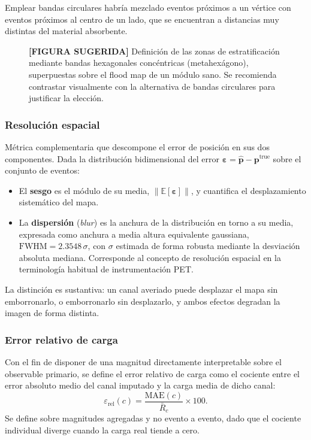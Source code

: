Emplear bandas circulares habría mezclado eventos próximos a un vértice con eventos próximos al
centro de un lado, que se encuentran a distancias muy distintas del material absorbente.

\begin{figure}[htbp]
\centering
\caption{\textbf{[FIGURA SUGERIDA]} Definición de las zonas de estratificación mediante bandas
hexagonales concéntricas (metahexágono), superpuestas sobre el flood map de un módulo sano. Se
recomienda contrastar visualmente con la alternativa de bandas circulares para justificar la
elección.}
\label{fig:metahexagono}
\end{figure}

\subsubsection{Resolución espacial}
\label{subsec:met-resolucion}

Métrica complementaria que descompone el error de posición en sus dos componentes. Dada la
distribución bidimensional del error $\boldsymbol{\varepsilon} = \hat{\mathbf{p}} - \mathbf{p}^{\text{true}}$
sobre el conjunto de eventos:
\begin{itemize}
    \item El \textbf{sesgo} es el módulo de su media, $\|\mathbb{E}[\boldsymbol{\varepsilon}]\|$, y
    cuantifica el desplazamiento sistemático del mapa.
    \item La \textbf{dispersión} (\emph{blur}) es la anchura de la distribución en torno a su media,
    expresada como anchura a media altura equivalente gaussiana,
    $\mathrm{FWHM} = 2.3548\,\sigma$, con $\sigma$ estimada de forma robusta mediante la desviación
    absoluta mediana. Corresponde al concepto de resolución espacial en la terminología habitual de
    instrumentación PET.
\end{itemize}

La distinción es sustantiva: un canal averiado puede desplazar el mapa sin emborronarlo, o
emborronarlo sin desplazarlo, y ambos efectos degradan la imagen de forma distinta.

\subsubsection{Error relativo de carga}
\label{subsec:met-relativo}

Con el fin de disponer de una magnitud directamente interpretable sobre el observable primario, se
define el error relativo de carga como el cociente entre el error absoluto medio del canal imputado
y la carga media de dicho canal:
\begin{equation}
    \varepsilon_{\text{rel}}(c) = \frac{\mathrm{MAE}(c)}{\bar{R}_c} \times 100.
\end{equation}
Se define sobre magnitudes agregadas y no evento a evento, dado que el cociente individual diverge
cuando la carga real tiende a cero.


